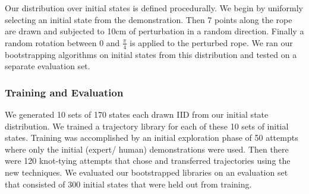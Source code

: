 Our distribution over initial states is defined procedurally. We begin by uniformly
selecting an initial state from the demonstration. Then 7 points along the rope are 
drawn and subjected to 10cm of perturbation in a random direction. Finally a random
rotation between 0 and $\frac{\pi}{4}$ is applied to the perturbed rope. We ran our
bootstrapping algorithms on initial states from this distribution and tested on a 
separate evaluation set.

\subsubsection{Training and Evaluation}
We generated 10 sets of 170 states each drawn IID from our initial state distribution.
We trained a trajectory library for each of these 10 sets of initial states.
Training was accomplished by an initial exploration phase of 50 attempts where only the initial (expert/ human) demonstrations were used. Then there were 120 knot-tying attempts that chose and transferred trajectories using the new techniques. We evaluated our bootstrapped libraries on an evaluation set that consisted of 300 initial states that were held out from training.
